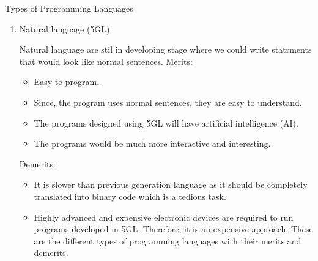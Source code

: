 \documentclass[11pt,titlepage,fleqn]{article}
\begin{document}
\begin{section}{Types of Programming Languages}
\begin{enumerate}
\begin{enumerate}
It allows the users to specify what the output should be, without describing all the details of how the data should be manupulated to produce the result. This is one step ahead from 3GL. These are result oriented and include database query language.
Eg: Visual Basic, C\#, PHP, etc.
The objectives of 4GL are to:
\begin{itemize}
\item  Increase the speed of developing programs.
\item Minimize user’s effort to botain information from computer.
\item Reduce errors while writing programs.
\end{itemize}
   Merits:
\begin{itemize}
\item  Programmer need not to think about the procedure of the program. So, programming is much easier.
\end{itemize}
Demerits:
\begin{itemize}
\item  It is easier but needs higher processor and larger memory.
\item It needs to be translated therefore its execution time is more.
\end{itemize}

\item  Natural language (5GL)

Natural language are stil in developing stage where we could write statrments that would look like normal sentences.
Merits:
\begin{itemize}
\item  Easy to program.
\item Since, the program uses normal sentences, they are easy to understand.
\item The programs designed using 5GL will have artificial intelligence (AI).
\item The programs would be much more interactive and interesting.
\end{itemize}
Demerits:
\begin{itemize}
\item It is slower than previous generation language as it should be completely translated into binary code which is a tedious task.
\item  Highly advanced and expensive electronic devices are required to run programs developed in 5GL. Therefore, it is an expensive approach.
These are the different types of programming languages with their merits and demerits.
\end{itemize}
\end{enumerate}
\end{enumerate}
\fi
\end{section}
\end{document}
